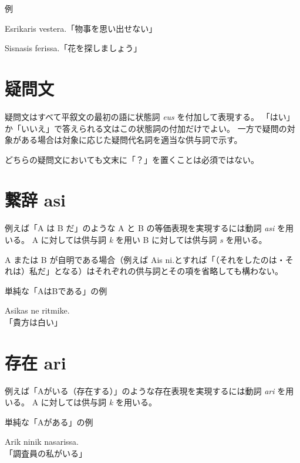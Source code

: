 \begin{itembox}[l]{例}
    \begin{pindent}
        \noindent
        Esrikaris vestera.「物事を思い出せない」

        \noindent
        Sisnasis ferissa.「花を探しましょう」
    \end{pindent}
\end{itembox}

\section{疑問文}

疑問文はすべて平叙文の最初の語に状態詞 \emph{eus} を付加して表現する。
「はい」か「いいえ」で答えられる文はこの状態詞の付加だけでよい。
一方で疑問の対象がある場合は対象に応じた疑問代名詞を適当な供与詞で示す。

どちらの疑問文においても文末に「？」を置くことは必須ではない。

\section{繋辞 asi}

例えば「A は B だ」のような A と B の等価表現を実現するには動詞 \emph{asi} を用いる。
A に対しては供与詞 \emph{k} を用い B に対しては供与詞 \emph{s} を用いる。

A または B が自明である場合（例えば Ais ni.とすれば「（それをしたのは・それは）私だ」となる）はそれぞれの供与詞とその項を省略しても構わない。

\begin{itembox}[l]{単純な「AはBである」の例}
    \begin{pindent}
        \noindent
        Asikas ne ritmike. \\
        「貴方は白い」
    \end{pindent}
\end{itembox}

\section{存在 ari}

例えば「Aがいる（存在する）」のような存在表現を実現するには動詞 \emph{ari} を用いる。
A に対しては供与詞 \emph{k} を用いる。

\begin{itembox}[l]{単純な「Aがある」の例}
    \begin{pindent}
        \noindent
        Arik ninik nasarissa. \\
        「調査員の私がいる」
    \end{pindent}
\end{itembox}
